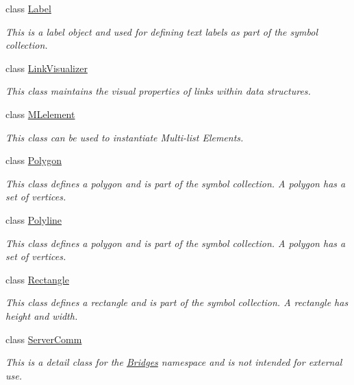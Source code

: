 \begin{DoxyCompactItemize}
class \mbox{\hyperlink{classbridges_1_1_label}{Label}}
\begin{DoxyCompactList}\small\item\em This is a label object and used for defining text labels as part of the symbol collection. \end{DoxyCompactList}\item 
class \mbox{\hyperlink{classbridges_1_1_link_visualizer}{Link\+Visualizer}}
\begin{DoxyCompactList}\small\item\em This class maintains the visual properties of links within data structures. \end{DoxyCompactList}\item 
class \mbox{\hyperlink{classbridges_1_1_m_lelement}{M\+Lelement}}
\begin{DoxyCompactList}\small\item\em This class can be used to instantiate Multi-\/list Elements. \end{DoxyCompactList}\item 
class \mbox{\hyperlink{classbridges_1_1_polygon}{Polygon}}
\begin{DoxyCompactList}\small\item\em This class defines a polygon and is part of the symbol collection. A polygon has a set of vertices. \end{DoxyCompactList}\item 
class \mbox{\hyperlink{classbridges_1_1_polyline}{Polyline}}
\begin{DoxyCompactList}\small\item\em This class defines a polygon and is part of the symbol collection. A polygon has a set of vertices. \end{DoxyCompactList}\item 
class \mbox{\hyperlink{classbridges_1_1_rectangle}{Rectangle}}
\begin{DoxyCompactList}\small\item\em This class defines a rectangle and is part of the symbol collection. A rectangle has height and width. \end{DoxyCompactList}\item 
class \mbox{\hyperlink{classbridges_1_1_server_comm}{Server\+Comm}}
\begin{DoxyCompactList}\small\item\em This is a detail class for the \mbox{\hyperlink{classbridges_1_1_bridges}{Bridges}} namespace and is not intended for external use. \end{DoxyCompactList}\item 

\end{DoxyCompactItemize}
